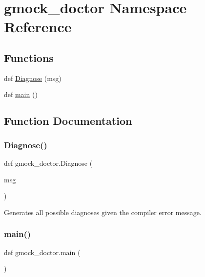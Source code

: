 \hypertarget{namespacegmock__doctor}{}\section{gmock\+\_\+doctor Namespace Reference}
\label{namespacegmock__doctor}
\subsection*{Functions}
\begin{DoxyCompactItemize}
\item 
def \mbox{\hyperlink{namespacegmock__doctor_a8b791ed6679a0135862ebb3e8c27b2b4}{Diagnose}} (msg)
\item 
def \mbox{\hyperlink{namespacegmock__doctor_a6eb6c47cf5a3a7c4266f473c0af6b82f}{main}} ()
\end{DoxyCompactItemize}


\subsection{Function Documentation}
\mbox{\label{namespacegmock__doctor_a8b791ed6679a0135862ebb3e8c27b2b4}} 
\subsubsection{\texorpdfstring{Diagnose()}{Diagnose()}}
{\footnotesize\ttfamily def gmock\+\_\+doctor.\+Diagnose (\begin{DoxyParamCaption}\item[{}]{msg }\end{DoxyParamCaption})}

\begin{DoxyVerb}Generates all possible diagnoses given the compiler error message.\end{DoxyVerb}
 \mbox{\label{namespacegmock__doctor_a6eb6c47cf5a3a7c4266f473c0af6b82f}} 
\subsubsection{\texorpdfstring{main()}{main()}}
{\footnotesize\ttfamily def gmock\+\_\+doctor.\+main (\begin{DoxyParamCaption}{ }\end{DoxyParamCaption})}

